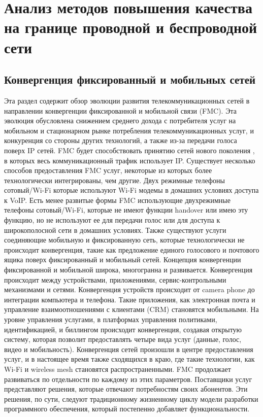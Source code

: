 \chapter{Анализ методов повышения качества на границе проводной и беспроводной сети} \label{chapt1}

\section{Конвергенция фиксированный и мобильных сетей} \label{sect1_1}
Эта раздел содержит обзор эволюции развития телекоммуникационных сетей в направлении конвергенции фиксированной и мобильной связи (FMC). Эта эволюция обусловлена снижением среднего дохода с потребителя услуг на мобильном и стационарном рынке потребления телекоммуникационных услуг, и конкуренция со стороны других технологий, а также из-за передачи голоса поверх IP сетей. FMC будет способствовать принятию сетей нового поколения \cite{FMC}, в которых весь коммуникационный трафик использует IP.
Существует несколько способов предоставления FMC услуг, некоторые из которых более технологически интегрированы, чем другие. Двух режимные телефоны сотовый/Wi-Fi которые используют Wi-Fi модемы в домашних условиях доступа к VoIP. Есть менее развитые формы FMC использующие двухрежимные телефоны сотовый/Wi-Fi, которые не имеют функции handover или имею эту функцию, но не используют ее для передачи голос или для доступа к широкополосной сети в домашних условиях. Также существуют услуги соединяющие мобильную и фиксированную сеть, которые технологически не происходит конвергенция, такие как предложение единого голосового и почтового ящика поверх фиксированный и мобильный сетей.
Концепция конвергенции фиксированной и мобильной широка, многогранна и развивается. Конвергенция происходит между устройствами, приложениями, сервис-контрольными механизмами и сетями. Конвергенция устройств происходит от camera phone до интеграции компьютера и телефона. Такие приложения, как электронная почта и управление взаимоотношениями с клиентами (CRM) становятся мобильными. На уровне управления услугами, в платформах управления политиками, идентификацией, и биллингом происходит конвергенция, создавая открытую систему, которая позволит предоставлять четыре вида услуг (данные, голос, видео и мобильность). Конвергенция сетей произошли в центре предоставления услуг, и в настоящее время также сходящихся в краю, где такие технологии, как Wi-Fi и wireless mesh становятся распространенными.
FMC продолжает развиваться по отдельности по каждому из этих параметров. Поставщики услуг представляют решения, которые отвечают потребностям своих абонентов. Эти решения, по сути, следуют традиционному жизненному циклу модели разработки программного обеспечения, который постепенно добавляет функциональности.
